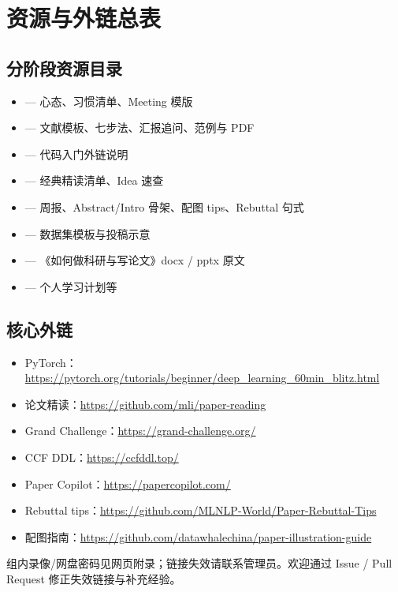 ﻿\section{资源与外链总表}
\label{sec:appendix}


\subsection{分阶段资源目录}
\begin{itemize}
  \item {} --- 心态、习惯清单、Meeting 模版
  \item {} --- 文献模板、七步法、汇报追问、范例与 PDF
  \item {} --- 代码入门外链说明
  \item {} --- 经典精读清单、Idea 速查
  \item {} --- 周报、Abstract/Intro 骨架、配图 tips、Rebuttal 句式
  \item {} --- 数据集模板与投稿示意
  \item {} --- 《如何做科研与写论文》docx / pptx 原文
  \item {} --- 个人学习计划等
\end{itemize}

\subsection{核心外链}
\begin{itemize}
  \item PyTorch：\url{https://pytorch.org/tutorials/beginner/deep_learning_60min_blitz.html}
  \item 论文精读：\url{https://github.com/mli/paper-reading}
  \item Grand Challenge：\url{https://grand-challenge.org/}
  \item CCF DDL：\url{https://ccfddl.top/}
  \item Paper Copilot：\url{https://papercopilot.com/}
  \item Rebuttal tips：\url{https://github.com/MLNLP-World/Paper-Rebuttal-Tips}
  \item 配图指南：\url{https://github.com/datawhalechina/paper-illustration-guide}
\end{itemize}

组内录像/网盘密码见网页附录；链接失效请联系管理员。欢迎通过 Issue / Pull Request 修正失效链接与补充经验。
